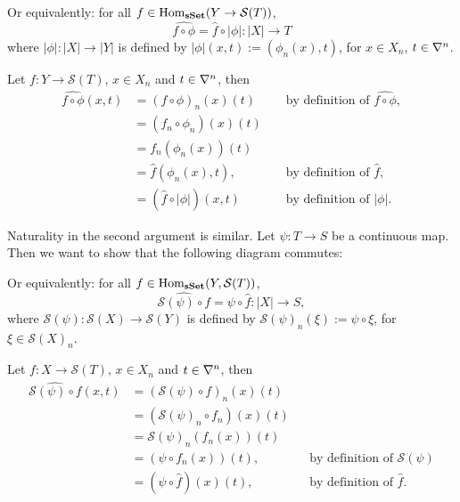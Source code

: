 \documentclass[a4paper,11pt,english]{article}
\renewcommand{\S}[1]{\mathcal{S}(#1)}
\begin{document}
\begin{exercise}[1]
\begin{enumerate}
\begin{center}
\end{center}

Or equivalently: for all $f \in \Hom_{\sSet}(Y \to \S T)$,
\[ \hat{f \circ \phi} = \hat f \circ |\phi| : |X| \to T \]
where $|\phi|: |X|\to|Y|$ is
defined by $|\phi|(x,t) := (\phi_n(x), t)$, for $x \in X_n$, $t \in \nabla^n$.

Let $f: Y \to \S T$, $x \in X_n$ and $t \in \nabla^n$, then
\begin{align*}
\hat{f \circ \phi} (x,t) &= (f \circ \phi)_n(x)(t)
&& \text{ by definition of }\hat{f \circ \phi}, \\
&= (f_n \circ \phi_n)(x)(t)\\
&= f_n(\phi_n(x))(t) \\
&= \hat f(\phi_n(x), t), 
&& \text{ by definition of } \hat{f}, \\
&= (\hat f \circ |\phi|)(x, t) 
&& \text{ by definition of } |\phi|. 
\end{align*}

Naturality in the second argument is similar. Let $\psi: T \to S$ be a continuous
map. Then we want to show that the following diagram commutes:

\begin{center}
\end{center}

Or equivalently: for all $f\in \Hom_{\sSet}(Y, \S T)$, 
\[ \hat{{\S\psi \circ f }} = \psi \circ \hat f : |X| \to S, \]
where $\S\psi: \S X \to \S Y$ is 
defined by $\S\psi_n(\xi) := \psi \circ \xi$, for $\xi \in \S X_n$.

Let $f: X \to \S T$, $x \in X_n$ and $t \in \nabla^n$, then
\begin{align*}
\hat{\S\psi \circ f}(x,t) &= (\S\psi \circ f)_n(x)(t) \\
&= (\S\psi_n \circ f_n)(x)(t) \\
&= \S\psi_n(f_n(x))(t) \\
&= (\psi \circ f_n(x))(t), 
&& \text{by definition of } \S\psi \\
&= (\psi \circ \hat f)(x)(t), 
&& \text{by definition of } \hat f.
\end{align*}

\end{enumerate}

\end{exercise}
\end{document}
